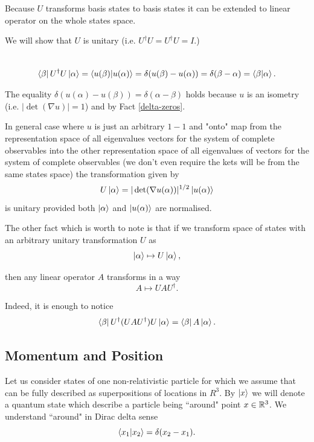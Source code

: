 \documentclass[main.tex]{subfiles}
\begin{document}
Because $U$ transforms basis states to basis states it can be extended to linear operator on the whole states space.

We will show that $U$ is unitary (i.e. $U^\dag U = U^\dag U = I$.)

\begin{multline*}
\\
\bra{\beta}U^\dag U \ket{\alpha} = \bra{u(\beta)}\ket{u(\alpha)} = \delta(u(\beta) - u(\alpha)) = 
\delta(\beta - \alpha) = \bra{\beta}\ket{\alpha}.\\
\end{multline*} 

The equality $\delta(u(\alpha) - u(\beta)) = \delta(\alpha - \beta)$ holds because $u$ is an isometry (i.e. $|\det (\nabla u)| = 1$) and by Fact \ref{delta-zeros}.

In general case where $u$ is just an arbitrary $1-1$ and "onto" map from the representation space of all eigenvalues vectors for the system of complete observables into the other representation space of all eigenvalues of vectors for the system of complete observables (we don't even require the kets will be from the same states space) the transformation given by
\begin{equation}
U \ket{\alpha} = |\det (\nabla u(\alpha))|^{1/2} \ket{u(\alpha)}
\end{equation} 
is unitary provided both $\ket{\alpha}$ and $\ket{u(\alpha)}$ are normalised.

The other fact which is worth to note is that if we transform space of states with an arbitrary unitary transformation $U$ as
\begin{equation}
\ket{\alpha} \mapsto U\ket{\alpha},
\end{equation} 

then any linear operator $A$ transforms in a way
\begin{equation}
A \mapsto UAU^\dag.
\end{equation}

Indeed, it is enough to notice
\begin{equation}
\bra{\beta}U^\dag(UAU^\dag)U \ket{\alpha} = \bra{\beta} A \ket{\alpha}.
\end{equation}



\subsection{Momentum and Position}

Let us consider states of one non-relativistic particle for which we assume that can be fully described as superpositions of locations in $R^3$. By $\ket{x}$ we will denote a quantum state which describe a particle being ``around" point $x\in \mathbb{R}^3$. We understand ``around" in Dirac delta sense
\begin{equation}
\bra{x_1}\ket{x_2} = \delta(x_2 - x_1).
\end{equation}
\end{document}
